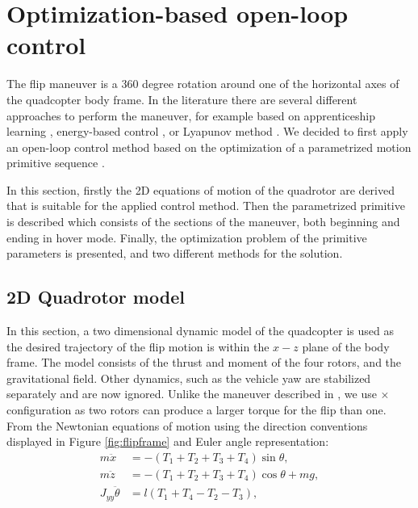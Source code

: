 \section{Optimization-based open-loop control}\label{sec:flip}
The flip maneuver is a 360 degree rotation around one of the horizontal axes of the quadcopter body frame. In the literature there are several different approaches to perform the maneuver, for example based on apprenticeship learning \cite{abbeel2010}, energy-based control \cite{energy-quaternion}, or Lyapunov method \cite{lyapunov-flip}. We decided to first apply an  open-loop control method based on the optimization of a parametrized motion primitive sequence \cite{LSICRA2010}.

In this section, firstly the 2D equations of motion of the quadrotor are derived that is suitable for the applied control method. Then the parametrized primitive is described which consists of the sections of the maneuver, both beginning and ending in hover mode. Finally, the optimization problem of the primitive parameters is presented, and two different methods for the solution. 

\subsection{2D Quadrotor model}

In this section, a two dimensional dynamic model of the quadcopter is used as the desired trajectory of the flip motion is within the $x-z$ plane of the body frame. The model consists of the thrust and moment of the four rotors, and the gravitational field. Other dynamics, such as the vehicle yaw are stabilized separately and are now ignored. Unlike the maneuver described in \cite{LSICRA2010}, we use $\times$ configuration as two rotors can produce a larger torque for the flip than one. From the Newtonian equations of motion using the direction conventions displayed in Figure \ref{fig:flipframe} and Euler angle representation:
\begin{align}
m\ddot{x}&=-(T_1 + T_2 + T_3 + T_4)\sin\theta,\\
m\ddot{z}&=-(T_1 + T_2 +T_3 + T_4) \cos\theta+mg,\\
J_{yy}\ddot{\theta} &= l(T_1+T_4-T_2-T_3),
\end{align}

